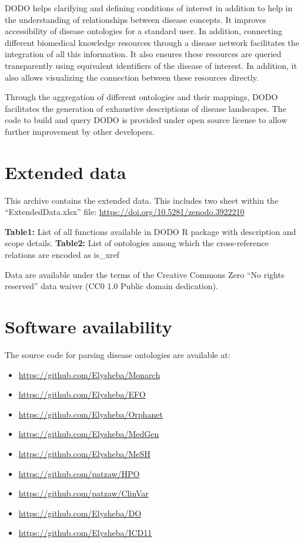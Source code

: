 \documentclass[9pt,a4paper,]{extarticle}
\begin{document}
DODO helps clarifying and defining conditions of interest in addition to help in the understanding of relationships between disease concepts. It improves accessibility of disease ontologies for a standard user. In addition, connecting different biomedical knowledge resources through a disease network facilitates the integration of all this information. It also ensures these resources are queried transparently using equivalent identifiers of the disease of interest. In addition, it also allows visualizing the connection between these resources directly.

Through the aggregation of different ontologies and their mappings, DODO facilitates the generation of exhaustive descriptions of disease landscapes. The code to build and query DODO is provided under open source license to allow further improvement by other developers.

\hypertarget{extended-data}{%
\section{Extended data}\label{extended-data}}

This archive contains the extended data. This includes two sheet within the ``ExtendedData.xlsx'' file:
\url{https://doi.org/10.5281/zenodo.3922210}

\textbf{Table1:} List of all functions available in DODO R package with description and scope details.
\textbf{Table2:} List of ontologies among which the cross-reference relations are encoded as is\_xref

Data are available under the terms of the Creative Commons Zero ``No rights reserved'' data waiver (CC0 1.0 Public domain dedication).

\hypertarget{software-availability}{%
\section{Software availability}\label{software-availability}}

The source code for parsing disease ontologies are available at:

\begin{itemize}
\item
  \url{https://github.com/Elysheba/Monarch}
\item
  \url{https://github.com/Elysheba/EFO}
\item
  \url{https://github.com/Elysheba/Orphanet}
\item
  \url{https://github.com/Elysheba/MedGen}
\item
  \url{https://github.com/Elysheba/MeSH}
\item
  \url{https://github.com/patzaw/HPO}
\item
  \url{https://github.com/patzaw/ClinVar}
\item
  \url{https://github.com/Elysheba/DO}
\item
  \url{https://github.com/Elysheba/ICD11}
\end{itemize}
\end{document}
